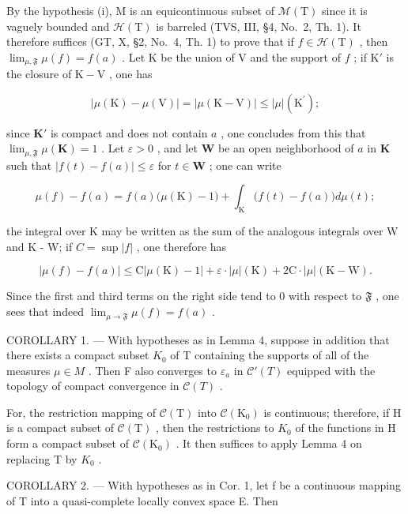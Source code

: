 By the hypothesis (i), M is an equicontinuous subset of \(\mathcal{M}(\mathrm{T})\) since it is vaguely bounded and \(\mathcal{H}(\mathrm{T})\) is barreled (TVS, III, §4, No.~2, Th. 1). It therefore suffices (GT, X, §2, No.~4, Th. 1) to prove that if \(f \in \mathcal{H}(\mathrm{T})\) , then \(\lim_{\mu, \mathfrak{F}} \mu(f) = f(a)\) . Let K be the union of V and the support of \(f\) ; if \(\mathrm{K}'\) is the closure of \(\mathrm{K} - \mathrm{V}\) , one has

\[
| \mu (\mathrm{K}) - \mu (\mathrm{V}) | = | \mu (\mathrm{K} - \mathrm{V}) | \leqslant | \mu | (\mathrm{K} ^ {\prime});
\]

since \(\mathbf{K}'\) is compact and does not contain \(a\) , one concludes from this that \(\lim_{\mu, \mathfrak{F}} \mu(\mathbf{K}) = 1\) . Let \(\varepsilon > 0\) , and let \(\mathbf{W}\) be an open neighborhood of \(a\) in \(\mathbf{K}\) such that \(|f(t) - f(a)| \leqslant \varepsilon\) for \(t \in \mathbf{W}\) ; one can write

\[
\mu (f) - f (a) = f (a) \big (\mu (\mathrm{K}) - 1 \big) + \int_ {\mathrm{K}} \big (f (t) - f (a) \big) d \mu (t);
\]

the integral over K may be written as the sum of the analogous integrals over W and K - W; if \(C = \sup |f|\) , one therefore has

\[
| \mu (f) - f (a) | \leqslant \mathrm{C} | \mu (\mathrm{K}) - 1 | + \varepsilon \cdot | \mu | (\mathrm{K}) + 2 \mathrm{C} \cdot | \mu | (\mathrm{K} - \mathrm{W}).
\]

Since the first and third terms on the right side tend to 0 with respect to \(\mathfrak{F}\) , one sees that indeed \(\lim_{\mu \to \mathfrak{F}} \mu(f) = f(a)\) .

COROLLARY 1. --- With hypotheses as in Lemma 4, suppose in addition that there exists a compact subset \(K_{0}\) of T containing the supports of all of the measures \(\mu \in M\) . Then F also converges to \(\varepsilon_{a}\) in \(\mathcal{C}'(T)\) equipped with the topology of compact convergence in \(\mathcal{C}(T)\) .

For, the restriction mapping of \(\mathcal{C}(\mathrm{T})\) into \(\mathcal{C}(\mathrm{K}_{0})\) is continuous; therefore, if H is a compact subset of \(\mathcal{C}(\mathrm{T})\) , then the restrictions to \(K_{0}\) of the functions in H form a compact subset of \(\mathcal{C}(\mathrm{K}_{0})\) . It then suffices to apply Lemma 4 on replacing T by \(K_{0}\) .

COROLLARY 2. --- With hypotheses as in Cor. 1, let f be a continuous mapping of T into a quasi-complete locally convex space E. Then

